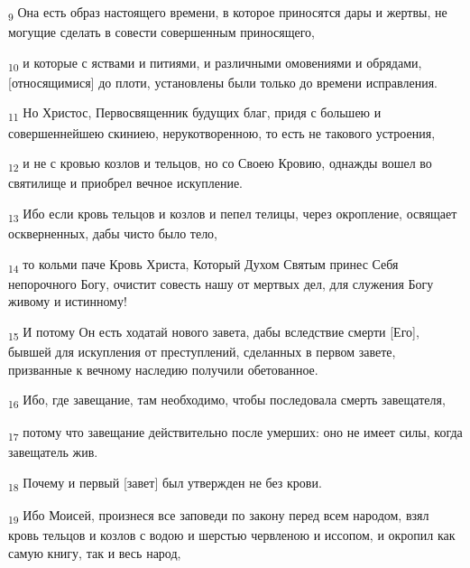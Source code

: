 \begin{tcolorbox}
\textsubscript{9} Она есть образ настоящего времени, в которое приносятся дары и жертвы, не могущие сделать в совести совершенным приносящего,
\end{tcolorbox}
\begin{tcolorbox}
\textsubscript{10} и которые с яствами и питиями, и различными омовениями и обрядами, [относящимися] до плоти, установлены были только до времени исправления.
\end{tcolorbox}
\begin{tcolorbox}
\textsubscript{11} Но Христос, Первосвященник будущих благ, придя с большею и совершеннейшею скиниею, нерукотворенною, то есть не такового устроения,
\end{tcolorbox}
\begin{tcolorbox}
\textsubscript{12} и не с кровью козлов и тельцов, но со Своею Кровию, однажды вошел во святилище и приобрел вечное искупление.
\end{tcolorbox}
\begin{tcolorbox}
\textsubscript{13} Ибо если кровь тельцов и козлов и пепел телицы, через окропление, освящает оскверненных, дабы чисто было тело,
\end{tcolorbox}
\begin{tcolorbox}
\textsubscript{14} то кольми паче Кровь Христа, Который Духом Святым принес Себя непорочного Богу, очистит совесть нашу от мертвых дел, для служения Богу живому и истинному!
\end{tcolorbox}
\begin{tcolorbox}
\textsubscript{15} И потому Он есть ходатай нового завета, дабы вследствие смерти [Его], бывшей для искупления от преступлений, сделанных в первом завете, призванные к вечному наследию получили обетованное.
\end{tcolorbox}
\begin{tcolorbox}
\textsubscript{16} Ибо, где завещание, там необходимо, чтобы последовала смерть завещателя,
\end{tcolorbox}
\begin{tcolorbox}
\textsubscript{17} потому что завещание действительно после умерших: оно не имеет силы, когда завещатель жив.
\end{tcolorbox}
\begin{tcolorbox}
\textsubscript{18} Почему и первый [завет] был утвержден не без крови.
\end{tcolorbox}
\begin{tcolorbox}
\textsubscript{19} Ибо Моисей, произнеся все заповеди по закону перед всем народом, взял кровь тельцов и козлов с водою и шерстью червленою и иссопом, и окропил как самую книгу, так и весь народ,
\end{tcolorbox}

